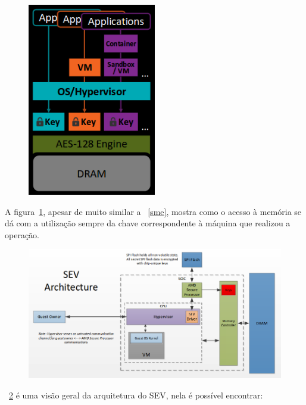 \documentclass{report}
\begin{document}
\begin{figure}[h]
    \centering
    \includegraphics[width=0.5\textwidth]{img/sev}
    \label{sev}
\end{figure}

A figura~\ref{sev}, apesar de muito similar a ~\ref{sme}, mostra como o
acesso à memória se dá com a utilização sempre da chave correspondente à
máquina que realizou a operação.


\begin{figure}[h]
    \centering
    \includegraphics[width=1\textwidth]{img/sev-architecture}
    \label{sev-architecture}
\end{figure}

~\ref{sev-architecture} é uma visão geral da arquitetura do SEV, nela é possível encontrar:
\end{document}
